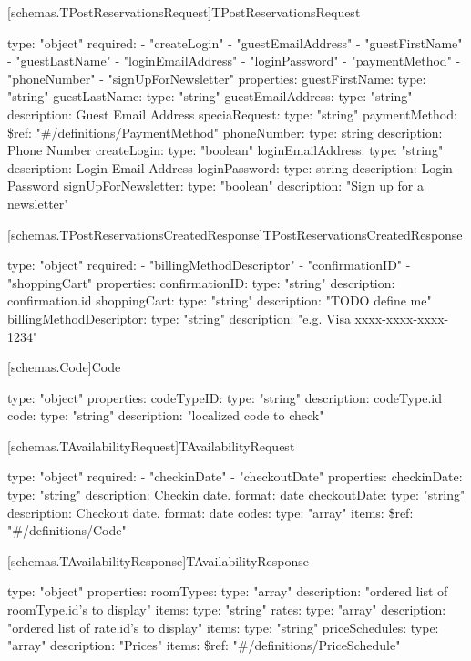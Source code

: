 [schemas.TPostReservationsRequest]{TPostReservationsRequest}
\begin{codeblock}
  type: "object"
  required:
  - "createLogin"
  - "guestEmailAddress"
  - "guestFirstName"
  - "guestLastName"
  - "loginEmailAddress"
  - "loginPassword"
  - "paymentMethod"
  - "phoneNumber"
  - "signUpForNewsletter"
  properties:
    guestFirstName:
      type: "string"
    guestLastName:
      type: "string"
    guestEmailAddress:
      type: "string"
      description: Guest Email Address
    speciaRequest:
      type: "string"
    paymentMethod:
      \$ref: "#/definitions/PaymentMethod"
    phoneNumber:
      type: string
      description: Phone Number
    createLogin:
      type: "boolean"
    loginEmailAddress:
      type: "string"
      description: Login Email Address
    loginPassword:
      type: string
      description: Login Password
    signUpForNewsletter:
      type: "boolean"
      description: "Sign up for a newsletter"
\end{codeblock}

[schemas.TPostReservationsCreatedResponse]{TPostReservationsCreatedResponse}
\begin{codeblock}
  type: "object"
  required:
  - "billingMethodDescriptor"
  - "confirmationID"
  - "shoppingCart"
  properties:
    confirmationID:
      type: "string"
      description: confirmation.id
    shoppingCart:
      type: "string"
      description: "TODO define me"
    billingMethodDescriptor:
      type: "string"
      description: "e.g. Visa xxxx-xxxx-xxxx-1234"
\end{codeblock}

[schemas.Code]{Code}
\begin{codeblock}
  type: "object"
  properties:
    codeTypeID:
      type: "string"
      description: codeType.id
    code:
      type: "string"
      description: "localized code to check"
\end{codeblock}

[schemas.TAvailabilityRequest]{TAvailabilityRequest}
\begin{codeblock}
  type: "object"
  required:
    - "checkinDate"
    - "checkoutDate"
  properties:
    checkinDate:
      type: "string"
      description: Checkin date.
      format: date
    checkoutDate:
      type: "string"
      description: Checkout date.
      format: date
    codes:
      type: "array"
      items:
        \$ref: "#/definitions/Code"
\end{codeblock}

[schemas.TAvailabilityResponse]{TAvailabilityResponse}
\begin{codeblock}
  type: "object"
  properties:
    roomTypes:
      type: "array"
      description: "ordered list of roomType.id's to display"
      items:
        type: "string"
    rates:
      type: "array"
      description: "ordered list of rate.id's to display"
      items:
        type: "string"
    priceSchedules:
      type: "array"
      description: "Prices"
      items:
        \$ref: "#/definitions/PriceSchedule"
\end{codeblock}


